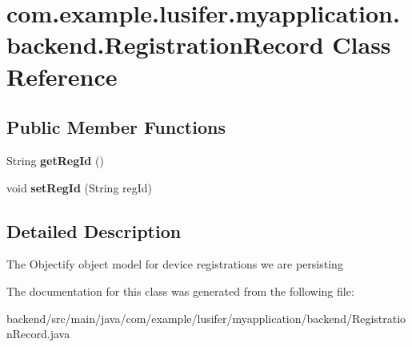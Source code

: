 \hypertarget{classcom_1_1example_1_1lusifer_1_1myapplication_1_1backend_1_1_registration_record}{}\section{com.\+example.\+lusifer.\+myapplication.\+backend.\+Registration\+Record Class Reference}
\label{classcom_1_1example_1_1lusifer_1_1myapplication_1_1backend_1_1_registration_record}
\subsection*{Public Member Functions}
\begin{DoxyCompactItemize}
\item 
\hypertarget{classcom_1_1example_1_1lusifer_1_1myapplication_1_1backend_1_1_registration_record_a0b9286ba33edf437a8aa48ec8cc8f325}{}String {\bfseries get\+Reg\+Id} ()\label{classcom_1_1example_1_1lusifer_1_1myapplication_1_1backend_1_1_registration_record_a0b9286ba33edf437a8aa48ec8cc8f325}

\item 
\hypertarget{classcom_1_1example_1_1lusifer_1_1myapplication_1_1backend_1_1_registration_record_a6dacf17f7ca6b071ed1464a81dbf95f0}{}void {\bfseries set\+Reg\+Id} (String reg\+Id)\label{classcom_1_1example_1_1lusifer_1_1myapplication_1_1backend_1_1_registration_record_a6dacf17f7ca6b071ed1464a81dbf95f0}

\end{DoxyCompactItemize}


\subsection{Detailed Description}
The Objectify object model for device registrations we are persisting 

The documentation for this class was generated from the following file\+:\begin{DoxyCompactItemize}
\item 
backend/src/main/java/com/example/lusifer/myapplication/backend/Registration\+Record.\+java\end{DoxyCompactItemize}
